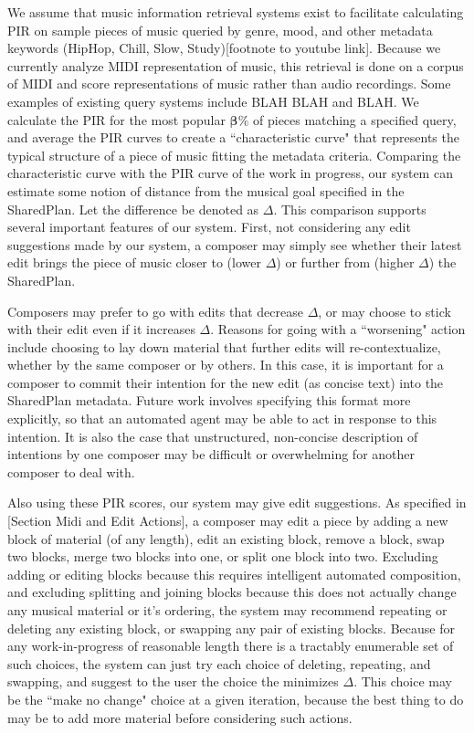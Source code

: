 \documentclass[final,authoryear,5p,times,twocolumn]{elsarticle}
\begin{document}
We assume that music information retrieval systems exist to facilitate calculating PIR on sample pieces of music queried by genre, mood, and other metadata keywords (HipHop, Chill, Slow, Study)[footnote to youtube link]. Because we currently analyze MIDI representation of music, this retrieval is done on a corpus of MIDI and score representations of music rather than audio recordings. Some examples of existing query systems include BLAH BLAH and BLAH. We calculate the PIR for the most popular $\boldsymbol{\beta}\%$ of pieces matching a specified query, and average the PIR curves to create a ``characteristic curve" that represents the typical structure of a piece of music fitting the metadata criteria. 
Comparing the characteristic curve with the PIR curve of the work in progress, our system can estimate some notion of distance from the musical goal specified in the SharedPlan. Let the difference be denoted as $\Delta$. This comparison supports several important features of our system. First, not considering any edit suggestions made by our system, a composer may simply see whether their latest edit brings the piece of music closer to (lower $\Delta$) or further from (higher $\Delta$) the SharedPlan.  

Composers may prefer to go with edits that decrease $\Delta$, or may choose to stick with their edit even if it increases $\Delta$. Reasons for going with a ``worsening" action include choosing to lay down material that further edits will re-contextualize, whether by the same composer or by others. In this case, it is important for a composer to commit their intention for the new edit (as concise text) into the SharedPlan metadata. Future work involves specifying this format more explicitly, so that an automated agent may be able to act in response to this intention. It is also the case that unstructured, non-concise description of intentions by one composer may be difficult or overwhelming for another composer to deal with.

Also using these PIR scores, our system may give edit suggestions. As specified in [Section Midi and Edit Actions], a composer may edit a piece by adding a new block of material (of any length), edit an existing block, remove a block, swap two blocks, merge two blocks into one, or split one block into two. Excluding adding or editing blocks because this requires intelligent automated composition, and excluding splitting and joining blocks because this does not actually change any musical material or it's ordering, the system may recommend repeating or deleting any existing block, or swapping any pair of existing blocks. Because for any work-in-progress of reasonable length there is a tractably enumerable set of such choices, the system can just try each choice of deleting, repeating, and swapping, and suggest to the user the choice the minimizes $\Delta$. This choice may be the ``make no change" choice at a given iteration, because the best thing to do may be to add more material before considering such actions.
\end{document}
